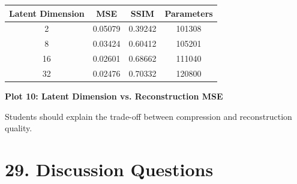 \documentclass[10pt]{article}
\begin{document}
\begin{center}
\begin{tabular}{|c|c|c|c|}
\hline
Latent Dimension & MSE & SSIM & Parameters \\
\hline
2 & 0.05079 & 0.39242 & 101308 \\
8 & 0.03424 & 0.60412 & 105201 \\
16 & 0.02601 & 0.68662 & 111040 \\
32 & 0.02476 & 0.70332 & 120800 \\
\hline
\end{tabular}
\end{center}


\textbf{Plot 10: Latent Dimension vs. Reconstruction MSE}

Students should explain the trade-off between compression and reconstruction
quality.

\section*{29. Discussion Questions}
\end{document}
